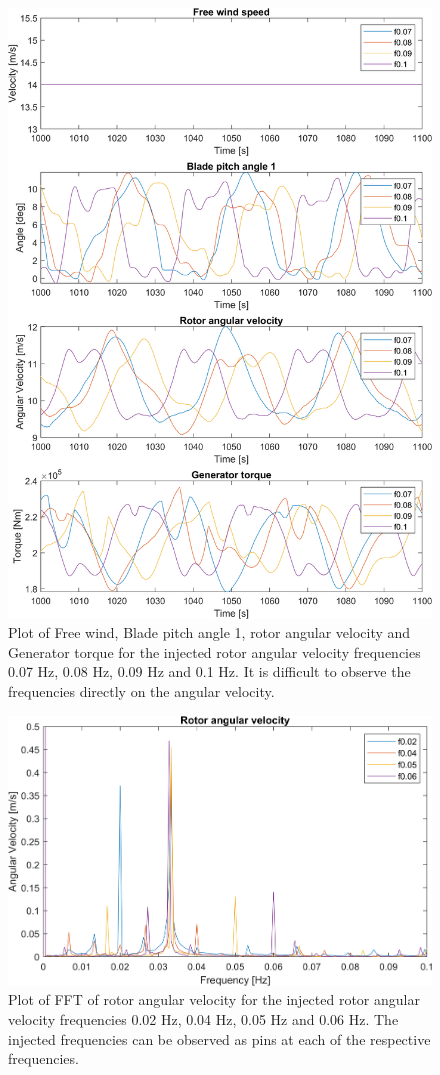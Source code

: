 \begin{figure}[h]
	\centering
	\includegraphics[width=0.8\linewidth]{Graphics/TestResults/tj00/tjj0_f07to1_VfreeToMgen.png}
	\caption{Plot of Free wind, Blade pitch angle 1, rotor angular velocity and Generator torque for the injected rotor angular velocity frequencies 0.07 Hz, 0.08 Hz, 0.09 Hz and 0.1 Hz. It is difficult to observe the frequencies directly on the angular velocity.}
	\label{fig:tjj0_f07to1VfreeToMgen}
\end{figure}

\begin{figure}[h]
	\centering
	\includegraphics[width=0.8\linewidth]{Graphics/TestResults/tj00/tjj0_f02to06OmegaFFT.png}
	\caption{Plot of FFT of rotor angular velocity for the injected rotor angular velocity frequencies 0.02 Hz, 0.04 Hz, 0.05 Hz and 0.06 Hz. The injected frequencies can be observed as pins at each of the respective frequencies.}
	\label{fig:tjj0_f02to06OmegaFFT}
\end{figure}

